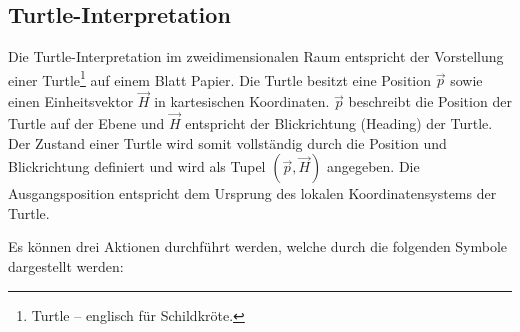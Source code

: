 \subsection{Turtle-Interpretation}

Die Turtle-Interpretation im zweidimensionalen Raum entspricht der Vorstellung einer Turtle\footnote{\glqq Turtle\grqq{} -- englisch für \glqq Schildkröte\grqq.} auf einem Blatt Papier. Die Turtle besitzt eine Position $\overrightarrow{p}$ sowie einen Einheitsvektor $\overrightarrow{H}$ in kartesischen Koordinaten. $\overrightarrow{p}$ beschreibt die Position der Turtle auf der Ebene und $\overrightarrow{H}$ entspricht der Blickrichtung (Heading) der Turtle. Der Zustand einer Turtle wird somit vollständig durch die Position und Blickrichtung definiert und wird als Tupel $(\overrightarrow{p},\overrightarrow{H})$ angegeben. \cite[S.2]{Turtle:04} Die Ausgangsposition entspricht dem Ursprung des lokalen Koordinatensystems der Turtle. 

Es können drei Aktionen durchführt werden, welche durch die folgenden Symbole dargestellt werden:

